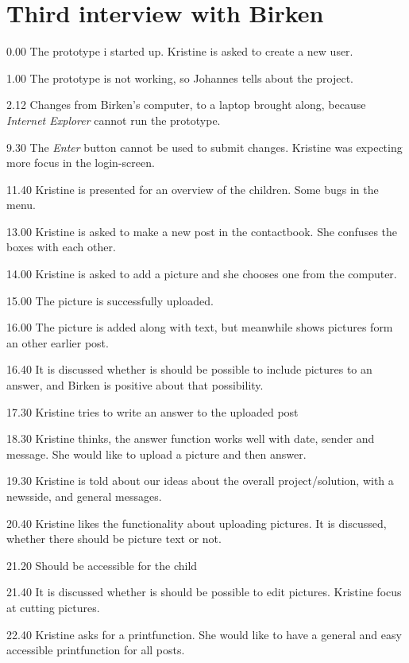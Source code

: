 \section*{Third interview with Birken}
\label{third_interview}

0.00
The prototype i started up.
Kristine is asked to create a new user.

1.00
The prototype is not working, so Johannes tells about the project.

2.12
Changes from Birken's computer, to a laptop brought along, because \textit{Internet Explorer} cannot run the prototype.

9.30
The \textit{Enter} button cannot be used to submit changes. Kristine was expecting more focus in the login-screen.

11.40
Kristine is presented for an overview of the children.
Some bugs in the menu.

13.00
Kristine is asked to make a new post in the contactbook. She confuses the boxes with each other.

14.00
Kristine is asked to add a picture and she chooses one from the computer.

15.00
The picture is successfully uploaded.

16.00
The picture is added along with text, but meanwhile shows pictures form an other earlier post.

16.40
It is discussed whether is should be possible to include pictures to an answer, and Birken is positive about that possibility.

17.30
Kristine tries to write an answer to the uploaded post

18.30
Kristine thinks, the answer function works well with date, sender and message. She would like to upload a picture and then answer.

19.30
Kristine is told about our ideas about the overall project/solution, with a newsside, and general messages.

20.40
Kristine likes the functionality about uploading pictures.
It is discussed, whether there should be picture text or not.

21.20
Should be accessible for the child 

21.40
It is discussed whether is should be possible to edit pictures. Kristine focus at cutting pictures.

22.40
Kristine asks for a printfunction. She would like to have a general and easy accessible printfunction for all posts.

